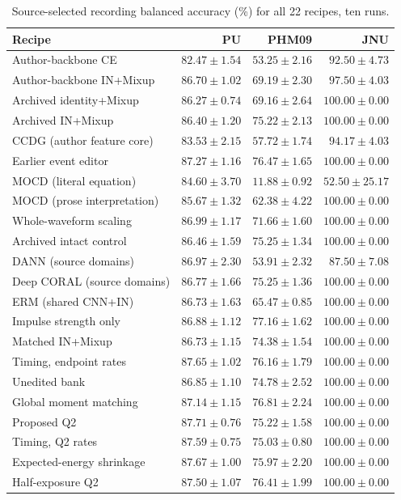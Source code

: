 \begin{table}[pos=htbp]
\centering\footnotesize
\caption{Source-selected recording balanced accuracy (\%) for all 22 recipes, ten runs.}
\label{tab:all-selected-recording_ba}
\begin{tabular}{lrrr}
\toprule
Recipe & PU & PHM09 & JNU\\
\midrule
Author-backbone CE & $82.47\pm1.54$ & $53.25\pm2.16$ & $92.50\pm4.73$\\
Author-backbone IN+Mixup & $86.70\pm1.02$ & $69.19\pm2.30$ & $97.50\pm4.03$\\
Archived identity+Mixup & $86.27\pm0.74$ & $69.16\pm2.64$ & $100.00\pm0.00$\\
Archived IN+Mixup & $86.40\pm1.20$ & $75.22\pm2.13$ & $100.00\pm0.00$\\
CCDG (author feature core) & $83.53\pm2.15$ & $57.72\pm1.74$ & $94.17\pm4.03$\\
Earlier event editor & $87.27\pm1.16$ & $76.47\pm1.65$ & $100.00\pm0.00$\\
MOCD (literal equation) & $84.60\pm3.70$ & $11.88\pm0.92$ & $52.50\pm25.17$\\
MOCD (prose interpretation) & $85.67\pm1.32$ & $62.38\pm4.22$ & $100.00\pm0.00$\\
Whole-waveform scaling & $86.99\pm1.17$ & $71.66\pm1.60$ & $100.00\pm0.00$\\
Archived intact control & $86.46\pm1.59$ & $75.25\pm1.34$ & $100.00\pm0.00$\\
DANN (source domains) & $86.97\pm2.30$ & $53.91\pm2.32$ & $87.50\pm7.08$\\
Deep CORAL (source domains) & $86.77\pm1.66$ & $75.25\pm1.36$ & $100.00\pm0.00$\\
ERM (shared CNN+IN) & $86.73\pm1.63$ & $65.47\pm0.85$ & $100.00\pm0.00$\\
Impulse strength only & $86.88\pm1.12$ & $77.16\pm1.62$ & $100.00\pm0.00$\\
Matched IN+Mixup & $86.73\pm1.15$ & $74.38\pm1.54$ & $100.00\pm0.00$\\
Timing, endpoint rates & $87.65\pm1.02$ & $76.16\pm1.79$ & $100.00\pm0.00$\\
Unedited bank & $86.85\pm1.10$ & $74.78\pm2.52$ & $100.00\pm0.00$\\
Global moment matching & $87.14\pm1.15$ & $76.81\pm2.24$ & $100.00\pm0.00$\\
Proposed Q2 & $87.71\pm0.76$ & $75.22\pm1.58$ & $100.00\pm0.00$\\
Timing, Q2 rates & $87.59\pm0.75$ & $75.03\pm0.80$ & $100.00\pm0.00$\\
Expected-energy shrinkage & $87.67\pm1.00$ & $75.97\pm2.20$ & $100.00\pm0.00$\\
Half-exposure Q2 & $87.50\pm1.07$ & $76.41\pm1.99$ & $100.00\pm0.00$\\
\bottomrule
\end{tabular}
\end{table}
